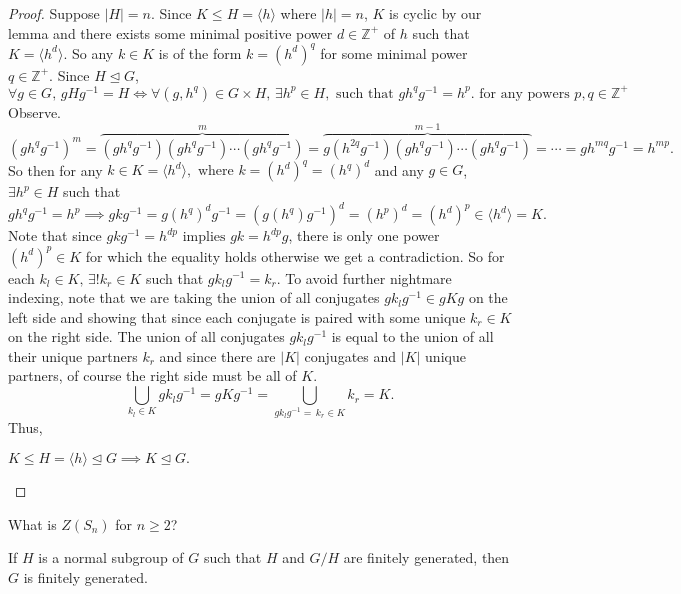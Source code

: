 \documentclass[addpoints,10pt]{exam}
\theoremstyle{plain}
\theoremstyle{definition}
\newtheorem{prob}[thm]{Problem}
\theoremstyle{plain}
\theoremstyle{plain}
\theoremstyle{definition}
\let\oldprob\prob
\let\endoldprob\endprob
\renewenvironment{prob}
  {\begin{singlespace}\oldprob}
  {\endoldprob\end{singlespace}}
\newcommand{\ZZ}{\ensuremath{\mathbb{Z}}}
\begin{document}
\begin{proof}
  Suppose $|H|=n$. Since $K\leq H=\langle h\rangle$ where $|h|=n$, $K$ is cyclic by our lemma and there exists some minimal positive power $d \in \ZZ^{+}$ of $h$ such that $K=\langle h^{d}\rangle.$ So any $k\in K$ is of the form $k=(h^{d})^{q}$ for some minimal power $q\in \ZZ^{+}$. Since $H\trianglelefteq G$, 
  $$\forall g\in G,\,gHg^{-1}=H\iff \forall (g,h^{q})\in G\times H,\,\exists h^{p}\in H,\text{ such that }gh^{q}g^{-1}=h^{p}.\text{ for any powers }p,q\in \ZZ^{+}$$
  Observe.
    $$(gh^{q}g^{-1})^{m}=\overbrace{(gh^{q}g^{-1})(gh^{q}g^{-1})\cdots (gh^{q}g^{-1})}^{m}=\overbrace{g(h^{2q}g^{-1})(gh^{q}g^{-1})\cdots (gh^{q}g^{-1})}^{m-1}=\cdots=gh^{mq}g^{-1}=h^{mp}.$$
  So then for any $k\in K=\langle h^{d}\rangle,\text{ where }k=(h^{d})^{q}=(h^{q})^{d}$ and any $g\in G$, $\exists h^{p}\in H$ such that
    $$gh^{q}g^{-1}=h^{p}\implies gkg^{-1}=g(h^{q})^{d}g^{-1}=(g(h^{q})g^{-1})^{d}=(h^{p})^{d}=(h^{d})^{p}\in \langle h^{d}\rangle=K.$$
  Note that since $gkg^{-1}=h^{dp}\text{ implies }gk=h^{dp}g$, there is only one power $(h^{d})^{p}\in K$ for which the equality holds otherwise we get a contradiction. So for each $k_{l}\in K,\,\exists! k_{r}\in K$ such that $gk_{l}g^{-1}=k_{r}$. To avoid further nightmare indexing, note that we are taking the union of all conjugates $gk_{l}g^{-1}\in gKg$ on the left side and showing that since each conjugate is paired with some unique $k_{r}\in K$ on the right side. The union of all conjugates $gk_{l}g^{-1}$ is equal to the union of all their unique partners $k_{r}$ and since there are $|K|$ conjugates and $|K|$ unique partners, of course the right side must be all of $K$.
  $$\bigcup_{k_{l}\in K}gk_{l}g^{-1}=gKg^{-1}=\bigcup_{gk_{l}g^{-1}=\,k_{r}\in K} k_{r}=K.$$
  Thus,
  \begin{center}
    $K\leq H=\langle h\rangle\trianglelefteq G\implies K\trianglelefteq G.$
  \end{center}

\end{proof}

\newpage
\begin{prob}
What is $Z(S_n)$ for $n \ge 2$?
\end{prob}

\begin{prob}
If $H$ is a normal subgroup of $G$ such that $H$ and $G/H$ are finitely generated, then $G$ is finitely generated.
\end{prob}
\end{document}
